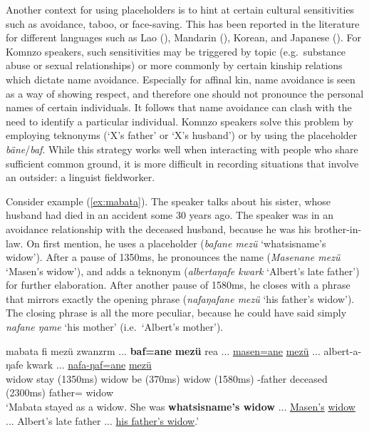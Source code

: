 \documentclass[output=paper,colorlinks,citecolor=brown]{langscibook}
\begin{document}
Another context for using placeholders is to hint at certain cultural sensitivities such as avoidance, taboo, or face-saving. This has been reported in the literature for different languages such as Lao (\cite[108ff.]{Enfield:2003rf}), Mandarin (\cite{Cheung:2015zo}), Korean, and Japanese (\cite[502ff.]{Hayashi:2006aa}). For Komnzo speakers, such sensitivities may be triggered by topic (e.g.\ substance abuse or sexual relationships) or more commonly by certain kinship relations which dictate name avoidance. Especially for affinal kin, name avoidance is seen as a way of showing respect, and therefore one should not pronounce the personal names of certain individuals. It follows that name avoidance can clash with the need to identify a particular individual. Komnzo speakers solve this problem by employing teknonyms (`X's father' or `X's husband') or by using the placeholder \textit{bäne}/\textit{baf}. While this strategy works well when interacting with people who share sufficient common ground, it is more difficult in recording situations that involve an outsider: a linguist fieldworker.

Consider example (\ref{ex:mabata}). The speaker talks about his sister, whose husband had died in an accident some 30 years ago. The speaker was in an avoidance relationship with the deceased husband, because he was his brother-in-law. On first mention, he uses a placeholder (\textit{bafane mezü} `whatsisname's widow'). After a pause of 1350ms, he pronounces the name (\textit{Masenane mezü} `Masen's widow'), and adds a teknonym (\textit{albertaŋafe kwark} `Albert's late father') for further elaboration. After another pause of 1580ms, he closes with a phrase that mirrors exactly the opening phrase (\textit{nafaŋafane mezü} `his father's widow'). The closing phrase is all the more peculiar, because he could have said simply \textit{nafane ŋame} `his mother' (i.e.\ `Albert's mother').

\ea \label{ex:mabata}
    \gll mabata fi mezü zwanzrm ... \textbf{baf=ane} \textbf{mezü} rea ... \uline{masen=ane} \uline{mezü} ... albert-a-ŋafe kwark ... \uline{nafa-ŋaf=ane} \uline{mezü}\\
      widow stay (1350ms)  widow be (370ms)  widow (1580ms) -father deceased (2300ms) father= widow\\
    \glt `Mabata stayed as a widow. She was \textbf{whatsisname's widow} ... \uline{Masen's} \uline{widow} ... Albert's late father ... \uline{his father's widow}.' 
\z
\end{document}
